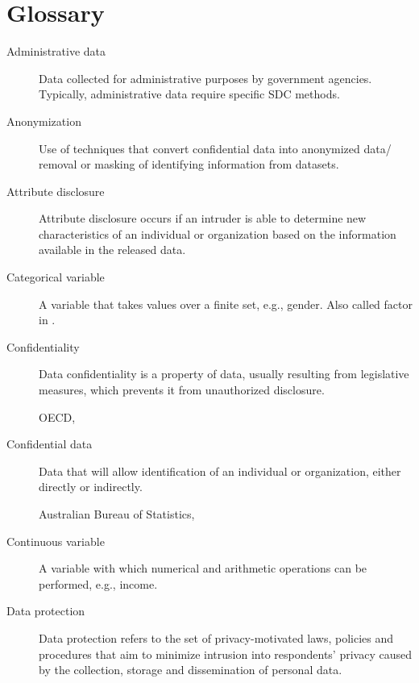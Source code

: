 \documentclass[letterpaper,10pt,english]{sphinxmanual}
\begin{document}
\section{Glossary}
\label{\detokenize{glossary_acr:glossary}}\begin{description}
\item[{Administrative data}] \leavevmode
Data collected for administrative purposes by government agencies.  Typically, administrative data require specific SDC methods.

\item[{Anonymization}] \leavevmode
Use of techniques that convert confidential data into anonymized data/ removal or masking of identifying information from   datasets.

\item[{Attribute disclosure}] \leavevmode
Attribute disclosure occurs if an intruder is able to determine new characteristics of an individual  or organization based on the   information available in the   released data.

\item[{Categorical variable}] \leavevmode
A variable that takes values over a finite set, e.g., gender. Also  called factor in .

\item[{Confidentiality}] \leavevmode
Data confidentiality is a property of data, usually resulting from legislative measures, which prevents it from  unauthorized   disclosure. %
\begin{footnote}[2]\sphinxAtStartFootnote
OECD, 
%
\end{footnote}

\item[{Confidential data}] \leavevmode
Data that will allow   identification of an individual   or organization, either directly  or indirectly. %
\begin{footnote}[1]\sphinxAtStartFootnote
Australian Bureau of Statistics, 
%
\end{footnote}

\item[{Continuous variable}] \leavevmode
A variable with which numerical   and arithmetic operations can be  performed, e.g., income.

\item[{Data protection}] \leavevmode
Data protection refers to the set of privacy-motivated laws, policies and procedures
that aim  to minimize intrusion into respondents’ privacy caused by the collection,
storage and dissemination of personal data.  \sphinxfootnotemark[2]


\end{description}
\end{document}
